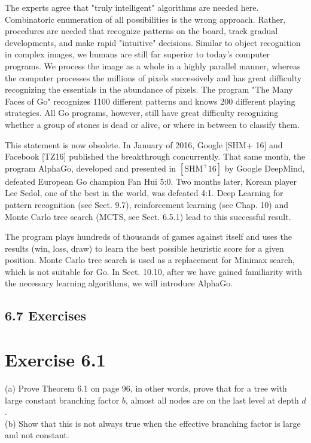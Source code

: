 \documentclass[10pt]{article}
\begin{document}
\begin{displayquote}
The experts agree that "truly intelligent" algorithms are needed here. Combinatoric enumeration of all possibilities is the wrong approach. Rather, procedures are needed that recognize patterns on the board, track gradual developments, and make rapid "intuitive" decisions. Similar to object recognition in complex images, we humans are still far superior to today's computer programs. We process the image as a whole in a highly parallel manner, whereas the computer processes the millions of pixels successively and has great difficulty recognizing the essentials in the abundance of pixels. The program "The Many Faces of Go" recognizes 1100 different patterns and knows 200 different playing strategies. All Go programs, however, still have great difficulty recognizing whether a group of stones is dead or alive, or where in between to classify them.
\end{displayquote}

This statement is now obsolete. In January of 2016, Google [SHM+ 16] and Facebook [TZ16] published the breakthrough concurrently. That same month, the program AlphaGo, developed and presented in $\left[\mathrm{SHM}^{+} 16\right]$ by Google DeepMind, defeated European Go champion Fan Hui 5:0. Two months later, Korean player Lee Sedol, one of the best in the world, was defeated 4:1. Deep Learning for pattern recognition (see Sect. 9.7), reinforcement learning (see Chap. 10) and Monte Carlo tree search (MCTS, see Sect. 6.5.1) lead to this successful result.


The program plays hundreds of thousands of games against itself and uses the results (win, loss, draw) to learn the best possible heuristic score for a given position. Monte Carlo tree search is used as a replacement for Minimax search, which is not suitable for Go. In Sect. 10.10, after we have gained familiarity with the necessary learning algorithms, we will introduce AlphaGo.

\subsection*{6.7 Exercises}
\section*{Exercise 6.1}
(a) Prove Theorem 6.1 on page 96, in other words, prove that for a tree with large constant branching factor $b$, almost all nodes are on the last level at depth $d$.\\
(b) Show that this is not always true when the effective branching factor is large and not constant.
\end{document}
